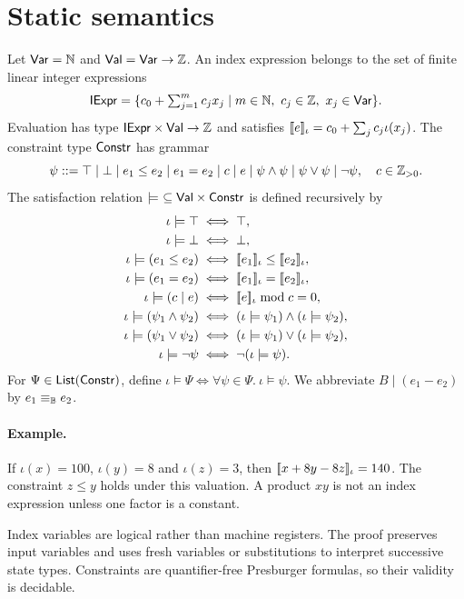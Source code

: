\section{Static semantics}\label{sec:static}
\begin{definition}\label{def:index}
Let $\mathsf{Var}=\mathbb{N}$ and $\mathsf{Val}=\mathsf{Var}\to\mathbb{Z}$. An index expression belongs to the set of finite linear integer expressions
\[\mathsf{IExpr}=\{c_0+\textstyle\sum_{j=1}^m c_jx_j\mid m\in\mathbb{N},\ c_j\in\mathbb{Z},\ x_j\in\mathsf{Var}\}.\]
Evaluation has type $\mathsf{IExpr}\times\mathsf{Val}\to\mathbb{Z}$ and satisfies $[\![e]\!]_{\iota}=c_0+\sum_j c_j\iota(x_j)$. The constraint type $\mathsf{Constr}$ has grammar
\[\psi::=\top\mid\bot\mid e_1\le e_2\mid e_1=e_2\mid c\mid e\mid\psi\land\psi\mid\psi\lor\psi\mid\lnot\psi,\quad c\in\mathbb{Z}_{>0}.\]
The satisfaction relation $\models\ \subseteq\mathsf{Val}\times\mathsf{Constr}$ is defined recursively by
\[
\begin{aligned}
\iota\models\top&\iff\top,\\ \iota\models\bot&\iff\bot,\\
\iota\models(e_1\le e_2)&\iff\ev{e_1}{\iota}\le\ev{e_2}{\iota},\\ 
\iota\models(e_1=e_2)&\iff\ev{e_1}{\iota}=\ev{e_2}{\iota},\\
\iota\models(c\mid e)&\iff\ev{e}{\iota}\bmod c=0,\\
\iota\models(\psi_1\land\psi_2)&\iff(\iota\models\psi_1)\land(\iota\models\psi_2),\\
\iota\models(\psi_1\lor\psi_2)&\iff(\iota\models\psi_1)\lor(\iota\models\psi_2),\\
\iota\models\lnot\psi&\iff\lnot(\iota\models\psi).
\end{aligned}
\]
For $\Psi\in\mathsf{List}(\mathsf{Constr})$, define $\iota\models\Psi\iff\forall\psi\in\Psi.\ \iota\models\psi$. We abbreviate $B\mid(e_1-e_2)$ by $e_1\equiv_{\mathbb{B}} e_2$.
\end{definition}

\paragraph{Example.} If $\iota(x)=100$, $\iota(y)=8$ and $\iota(z)=3$, then $[\![x+8y-8z]\!]_{\iota}=140$. The constraint $z\le y$ holds under this valuation. A product $xy$ is not an index expression unless one factor is a constant.


Index variables are logical rather than machine registers. The proof preserves input variables and uses fresh variables or substitutions to interpret successive state types. Constraints are quantifier-free Presburger formulas, so their validity is decidable.

